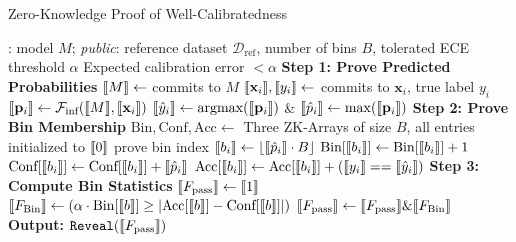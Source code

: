 \begin{algorithm}[h]
\small

\caption{Zero-Knowledge Proof of Well-Calibratedness}
\label{alg:calibration-zkp}
\begin{algorithmic}[1]
\Require
\prover: model $M$; \emph{public}: reference dataset $\mathcal{D}_{\text{ref}}$, number of bins $B$, tolerated ECE threshold $\alpha$
\Ensure Expected calibration error $< \alpha$
\State \textbf{Step 1: Prove Predicted Probabilities}
\State $\llbracket M \rrbracket \gets$ \prover commits to $M$
    \State $\llbracket \mathbf{x}_i \rrbracket, \llbracket y_i \rrbracket \gets$ \prover commits to $\mathbf{x}_i$, true label $y_i$
    \State $\llbracket \mathbf{p}_i \rrbracket \gets \mathcal{F}_{\text{inf}}(\llbracket M \rrbracket,\llbracket \mathbf{x}_i \rrbracket)$ {\scriptsize{}}
    \State $\llbracket \hat{y}_i \rrbracket \gets \text{argmax}(\llbracket \mathbf{p}_i \rrbracket)$ \& $\llbracket \hat{p}_i \rrbracket \gets \max (\llbracket \mathbf{p}_i \rrbracket)$
\EndFor
\State \textbf{Step 2: Prove Bin Membership}
\State $\text{Bin}, \text{Conf}, \text{Acc} \gets $ Three ZK-Arrays of size $B$, all entries initialized to $\llbracket 0 \rrbracket$
    \State prove bin index $\llbracket b_i \rrbracket \gets \lfloor \llbracket \hat{p}_i \rrbracket \cdot B \rfloor$ {\scriptsize{}}
    \State $\text{Bin}[\llbracket b_i \rrbracket] \gets \text{Bin}[\llbracket b_i \rrbracket] + 1$
    \State $\text{Conf}[\llbracket b_i \rrbracket] \gets \text{Conf}[\llbracket b_i \rrbracket] + \llbracket \hat{p}_i \rrbracket$
    \State $\text{Acc}[\llbracket b_i \rrbracket] \gets \text{Acc}[\llbracket b_i \rrbracket] + (\llbracket y_i \rrbracket == \llbracket \hat{y}_i \rrbracket)$
\EndFor
\State \textbf{Step 3: Compute Bin Statistics}
\State $\llbracket F_\text{pass} \rrbracket \gets \llbracket 1 \rrbracket$ {\scriptsize{}}
    \State $\llbracket F_\text{Bin} \rrbracket \gets (\alpha \cdot \text{Bin}[\llbracket b \rrbracket] \geq \left| \text{Acc}[\llbracket b \rrbracket] - \text{Conf}[\llbracket b \rrbracket] \right|)$
    {\scriptsize{}}
    \State $\llbracket F_\text{pass} \rrbracket \gets \llbracket F_\text{pass} \rrbracket \& \llbracket F_\text{Bin} \rrbracket$ 
\EndFor
\State \textbf{Output:} $\texttt{Reveal}(\llbracket F_\text{pass} \rrbracket)$
\end{algorithmic}
\end{algorithm}


